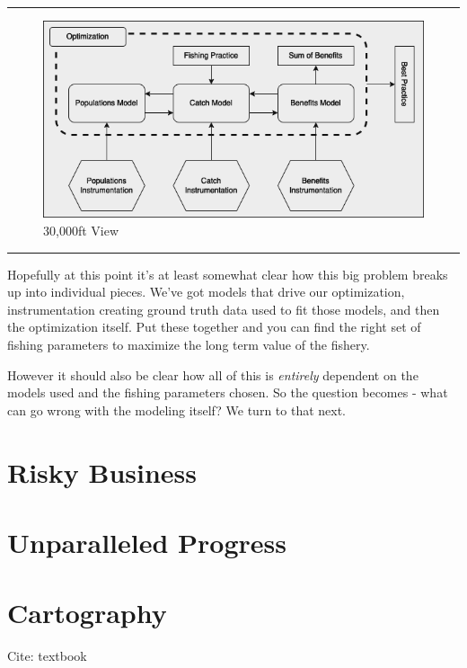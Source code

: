 \documentclass[11pt,a5paper]{book}
\begin{document}
\noindent \rule{\textwidth}{0.5pt} 
\begin{figure}[h!] 
  \includegraphics[width=\linewidth]{drawings/high_level.png}
  \caption{30,000ft View}
  \label{fig:high_level}
\end{figure}
\newline
\rule{\textwidth}{0.5pt} 
\vspace{5pt}

Hopefully at this point it's at least somewhat clear how this big problem breaks up into individual pieces. We've got models that drive our optimization, instrumentation creating ground truth data used to fit those models, and then the optimization itself. Put these together and you can find the right set of fishing parameters to maximize the long term value of the fishery. 
\newline

However it should also be clear how all of this is \textit{entirely} dependent on the models used and the fishing parameters chosen. So the question becomes - what can go wrong with the modeling itself? We turn to that next. 


\newpage


\section{Risky Business}
\newpage

\section{Unparalleled Progress}
\newpage

\section{Cartography}


Cite:
textbook


\end{document}
